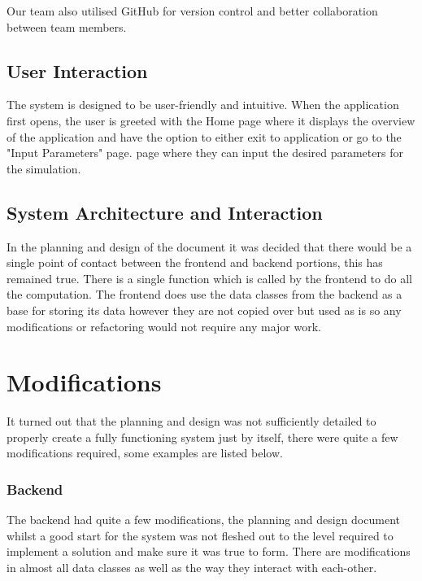 \documentclass{article}
\begin{document}
    Our team also utilised GitHub for version control and better collaboration between team members.

    \subsection{User Interaction}

    The system is designed to be user-friendly and intuitive. When the application first opens, the user is greeted with the Home page where it displays the overview of the application and have the option to either exit to application or go to the "Input Parameters" page.
    page where they can input the desired parameters for the simulation.

    \subsection{System Architecture and Interaction}

    In the planning and design of the document it was decided that there would be a single point of contact between
    the frontend and backend portions, this has remained true. There is a single function which is called by the
    frontend to do all the computation. The frontend does use the data classes from the backend as a base for
    storing its data however they are not copied over but used as is so any modifications or refactoring would not
    require any major work.


    \section{Modifications}

    It turned out that the planning and design was not sufficiently detailed to properly create a fully functioning
    system just by itself, there were quite a few modifications required, some examples are listed below.

    \subsubsection{Backend}

    The backend had quite a few modifications, the planning and design document whilst a good start for the system was
    not fleshed out to the level required to implement a solution and make sure it was true to form. There are modifications
    in almost all data classes as well as the way they interact with each-other.
\end{document}
